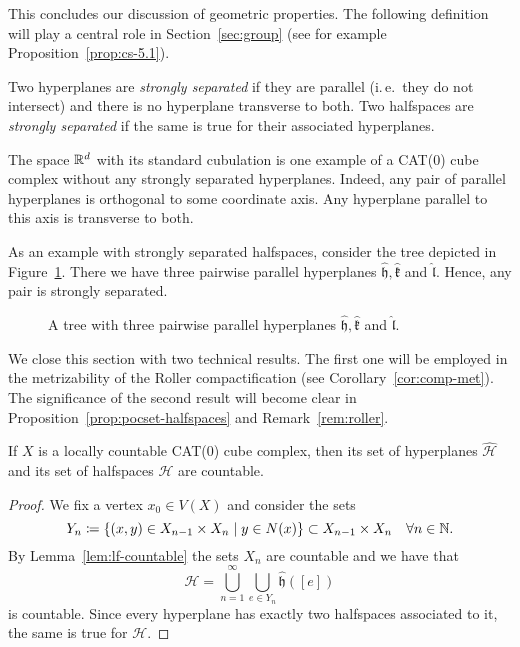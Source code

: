 This concludes our discussion of geometric properties. The following definition will play a central role in Section~\ref{sec:group} (see for example Proposition~\ref{prop:cs-5.1}).

\begin{defin}
  \label{defin:strong-sep}
  Two hyperplanes are \emph{strongly separated} if they are parallel (i.\,e.\ they do not intersect) and there is no hyperplane transverse to both. Two halfspaces are \emph{strongly separated} if the same is true for their associated hyperplanes.
\end{defin}

\begin{bsp}
  The space \(\mathbb{R}^d\) with its standard cubulation is one example of a CAT(0) cube complex without any strongly separated hyperplanes. Indeed, any pair of parallel hyperplanes is orthogonal to some coordinate axis. Any hyperplane parallel to this axis is transverse to both.

  As an example with strongly separated halfspaces, consider the tree depicted in Figure~\ref{fig:str-sep}. There we have three pairwise parallel hyperplanes \(\mathfrak{\hat h}, \mathfrak{\hat k}\) and \(\mathfrak{\hat l}\). Hence, any pair is strongly separated.

  \begin{figure}[htbp]
    \centering
    
    \caption{A tree with three pairwise parallel hyperplanes \(\mathfrak{\hat h}, \mathfrak{\hat k}\) and \(\mathfrak{\hat l}\).}
    \label{fig:str-sep}
  \end{figure}
\end{bsp}

We close this section with two technical results. The first one will be employed in the metrizability of the Roller compactification (see Corollary~\ref{cor:comp-met}). The significance of the second result will become clear in Proposition~\ref{prop:pocset-halfspaces} and Remark~\ref{rem:roller}.

\begin{cor}
  \label{cor:halfspace-countable}
  If \(X\) is a locally countable CAT(0) cube complex, then its set of hyperplanes \(\mathcal{\hat H}\) and its set of halfspaces \(\mathcal{H}\) are countable.
\end{cor}

\begin{proof}
  We fix a vertex \(x_0 \in V(X)\) and consider the sets
  \[
    Y_n \coloneqq \{(x,y) \in X_{n-1} \times X_{n} \mid y \in N(x)\} \subset X_{n-1} \times X_n \quad \forall n \in \mathbb{N}.
  \]
  By Lemma~\ref{lem:lf-countable} the sets \(X_n\) are countable and we have that
  \[
    \mathcal{\hat H} = \bigcup_{n=1}^\infty \bigcup_{e \in Y_n} \mathfrak{\hat h}([e])
  \]
  is countable. Since every hyperplane has exactly two halfspaces associated to it, the same is true for \(\mathcal{H}\).
\end{proof}

